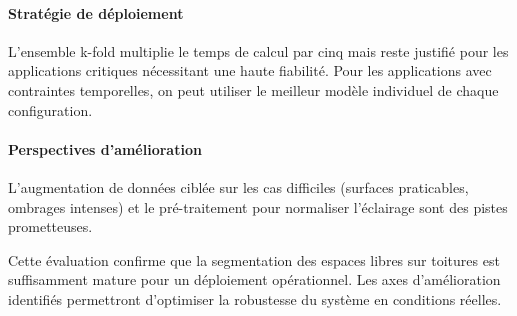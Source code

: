 \paragraph{Stratégie de déploiement}
L'ensemble k-fold multiplie le temps de calcul par cinq mais reste justifié pour les applications critiques nécessitant une haute fiabilité. Pour les applications avec contraintes temporelles, on peut utiliser le meilleur modèle individuel de chaque configuration.

\paragraph{Perspectives d'amélioration}
L'augmentation de données ciblée sur les cas difficiles (surfaces praticables, ombrages intenses) et le pré-traitement pour normaliser l'éclairage sont des pistes prometteuses.

Cette évaluation confirme que la segmentation des espaces libres sur toitures est suffisamment mature pour un déploiement opérationnel. Les axes d'amélioration identifiés permettront d'optimiser la robustesse du système en conditions réelles.